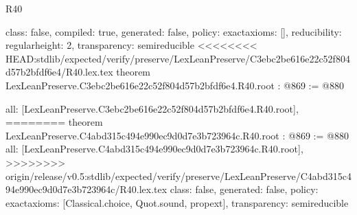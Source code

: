 \begin{lexlean}{R40}
\begin{coremodule}
{{{{{  class: false,
  compiled: true,
  generated: false,
  policy: exact{axioms: []},
  reducibility: regular{height: 2},
  transparency: semireducible
}
<<<<<<<< HEAD:stdlib/expected/verify/preserve/LexLeanPreserve/C3ebc2be616e22c52f804d57b2bfdf6e4/R40.lex.tex
theorem LexLeanPreserve.C3ebc2be616e22c52f804d57b2bfdf6e4.R40.root : @869 := @880 {
  all: [LexLeanPreserve.C3ebc2be616e22c52f804d57b2bfdf6e4.R40.root],
========
theorem LexLeanPreserve.C4abd315c494e990ec9d0d7e3b723964c.R40.root : @869 := @880 {
  all: [LexLeanPreserve.C4abd315c494e990ec9d0d7e3b723964c.R40.root],
>>>>>>>> origin/release/v0.5:stdlib/expected/verify/preserve/LexLeanPreserve/C4abd315c494e990ec9d0d7e3b723964c/R40.lex.tex
  class: false,
  generated: false,
  policy: exact{axioms: [Classical.choice, Quot.sound, propext]},
  transparency: semireducible
}

}}}}}
\end{coremodule}
\end{lexlean}
